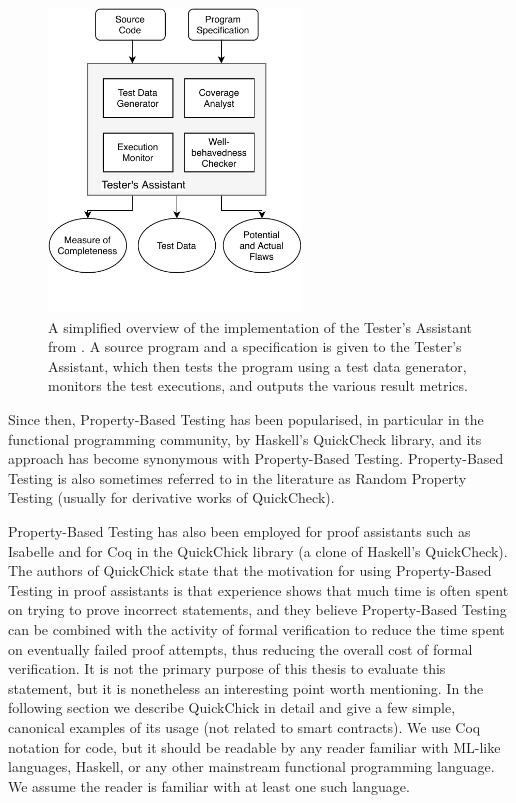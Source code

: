 \documentclass[twoside,11pt,openright]{report}
\newcommand{\pbt}{Property-Based Testing}
\begin{document}
\begin{figure}[h]
\begin{center}
\includegraphics[width=0.6\textwidth]{media/Tester's Assistant.pdf}
\end{center}
\caption[Figure description for the Tester's Assistant from \cite{fink1997property}.]{A simplified overview of the implementation of the Tester's Assistant from \cite{fink1997property}. A source program and a specification is given to the Tester's Assistant, which then tests the program using a test data generator, monitors the test executions, and outputs the various result metrics.}
\label{fig:testers-assistant}
\end{figure}
Since then, \pbt{} has been popularised, in particular in the functional programming community, by Haskell's QuickCheck library\cite{claessen2011quickcheck}, and its approach has become synonymous with \pbt{}. \pbt{} is also sometimes referred to in the literature as Random Property Testing (usually for derivative works of QuickCheck).

\pbt{} has also been employed for proof assistants such as Isabelle\cite{bulwahn2012new} and for Coq in the QuickChick library\cite{denes2014quickchick} (a clone of Haskell's QuickCheck). The authors of QuickChick state that the motivation for using \pbt{} in proof assistants is that experience shows that much time is often spent on trying to prove incorrect statements, and they believe \pbt{} can be combined with the activity of formal verification to reduce the time spent on eventually failed proof attempts, thus reducing the overall cost of formal verification. It is not the primary purpose of this thesis to evaluate this statement, but it is nonetheless an interesting point worth mentioning. In the following section we describe QuickChick in detail and give a few simple, canonical examples of its usage (not related to smart contracts). We use Coq notation for code, but it should be readable by any reader familiar with ML-like languages, Haskell, or any other mainstream functional programming language. We assume the reader is familiar with at least one such language.
\end{document}
